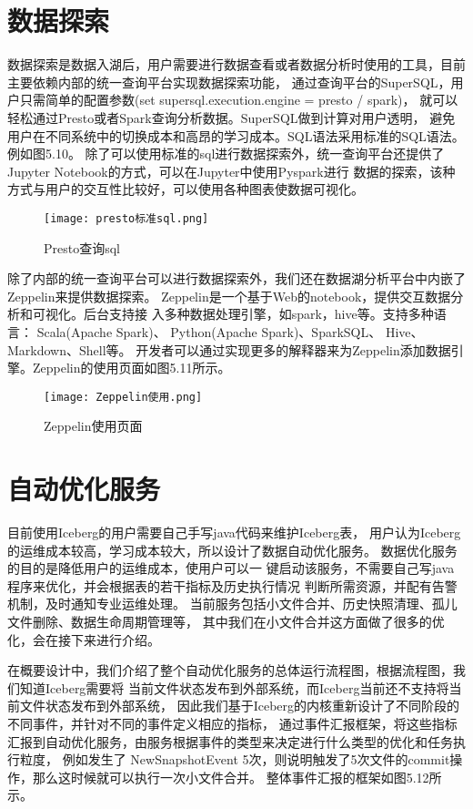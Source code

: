 \section{数据探索}

数据探索是数据入湖后，用户需要进行数据查看或者数据分析时使用的工具，目前主要依赖内部的统一查询平台实现数据探索功能，
通过查询平台的SuperSQL，用户只需简单的配置参数(set supersql.execution.engine = presto / spark)，
就可以轻松通过Presto或者Spark查询分析数据。SuperSQL做到计算对用户透明，
避免用户在不同系统中的切换成本和高昂的学习成本。SQL语法采用标准的SQL语法。例如图5.10。
除了可以使用标准的sql进行数据探索外，统一查询平台还提供了Jupyter Notebook的方式，可以在Jupyter中使用Pyspark进行
数据的探索，该种方式与用户的交互性比较好，可以使用各种图表使数据可视化。

\begin{figure}[h]
  \centering
  \texttt{[image: presto标准sql.png]}
  \caption{Presto查询sql}
  \label{fig:badge}
\end{figure}

除了内部的统一查询平台可以进行数据探索外，我们还在数据湖分析平台中内嵌了Zeppelin来提供数据探索。
Zeppelin是一个基于Web的notebook，提供交互数据分析和可视化。后台支持接
入多种数据处理引擎，如spark，hive等。支持多种语言： Scala(Apache Spark)、
Python(Apache Spark)、SparkSQL、 Hive、 Markdown、Shell等。
开发者可以通过实现更多的解释器来为Zeppelin添加数据引擎。Zeppelin的使用页面如图5.11所示。

\begin{figure}[h]
  \centering
  \texttt{[image: Zeppelin使用.png]}
  \caption{Zeppelin使用页面}
  \label{fig:badge}
\end{figure}

\section{自动优化服务}

目前使用Iceberg的用户需要自己手写java代码来维护Iceberg表，
用户认为Iceberg的运维成本较高，学习成本较大，所以设计了数据自动优化服务。
数据优化服务的目的是降低用户的运维成本，使用户可以一
键启动该服务，不需要自己写java程序来优化，并会根据表的若干指标及历史执行情况
判断所需资源，并配有告警机制，及时通知专业运维处理。
当前服务包括小文件合并、历史快照清理、孤儿文件删除、数据生命周期管理等，
其中我们在小文件合并这方面做了很多的优化，会在接下来进行介绍。

在概要设计中，我们介绍了整个自动优化服务的总体运行流程图，根据流程图，我们知道Iceberg需要将
当前文件状态发布到外部系统，而Iceberg当前还不支持将当前文件状态发布到外部系统，
因此我们基于Iceberg的内核重新设计了不同阶段的不同事件，并针对不同的事件定义相应的指标，
通过事件汇报框架，将这些指标汇报到自动优化服务，由服务根据事件的类型来决定进行什么类型的优化和任务执行粒度，
例如发生了 NewSnapshotEvent 5次，则说明触发了5次文件的commit操作，那么这时候就可以执行一次小文件合并。
整体事件汇报的框架如图5.12所示。

